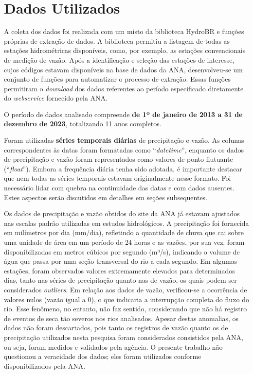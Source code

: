 \section{Dados Utilizados}

A coleta dos dados foi realizada com um misto da biblioteca HydroBR \cite{carvalho2020hydrobr} e funções próprias de extração de dados. A biblioteca permitiu a listagem de todas as estações hidrométricas disponíveis, como, por exemplo, as estações convencionais de medição de vazão. Após a identificação e seleção das estações de interesse, cujos códigos estavam disponíveis na base de dados da ANA, desenvolveu-se um conjunto de funções para automatizar o processo de extração. Essas funções permitiram o \textit{download} dos dados referentes ao período especificado diretamente do \textit{webservice} fornecido pela ANA.

O período de dados analisado compreende \textbf{de 1º de janeiro de 2013 a 31 de dezembro de 2023}, totalizando 11 anos completos.

Foram utilizadas \textbf{séries temporais diárias} de precipitação e vazão. As colunas correspondentes às datas foram formatadas como ``\textit{datetime}'', enquanto os dados de precipitação e vazão foram representados como valores de ponto flutuante (``\textit{float}''). Embora a frequência diária tenha sido adotada, é importante destacar que nem todas as séries temporais estavam originalmente nesse formato. Foi necessário lidar com quebra na continuidade das datas e com dados ausentes. Estes aspectos serão discutidos em detalhes em seções subsequentes.

Os dados de precipitação e vazão obtidos do site da ANA já estavam ajustados nas escalas padrão utilizadas em estudos hidrológicos. A precipitação foi fornecida em milímetros por dia (mm/dia), refletindo a quantidade de chuva que cai sobre uma unidade de área em um período de 24 horas e as vazões, por sua vez, foram disponibilizadas em metros cúbicos por segundo (m³/s), indicando o volume de água que passa por uma seção transversal do rio a cada segundo. Em algumas estações, foram observados valores extremamente elevados para determinados dias, tanto nas séries de precipitação quanto nas de vazão, os quais podem ser considerados \textit{outliers}. Em relação aos dados de vazão, verificou-se a ocorrência de valores nulos (vazão igual a 0), o que indicaria a interrupção completa do fluxo do rio. Esse fenômeno, no entanto, não faz sentido, considerando que não há registro de eventos de seca tão severos nos rios analisados. Apesar destas anomalias, os dados não foram descartados, pois tanto os registros de vazão quanto os de precipitação utilizados nesta pesquisa foram considerados consistidos pela ANA, ou seja, foram medidos e validados pela agência. O presente trabalho não questionou a veracidade dos dados; eles foram utilizados conforme disponibilizados pela ANA.

